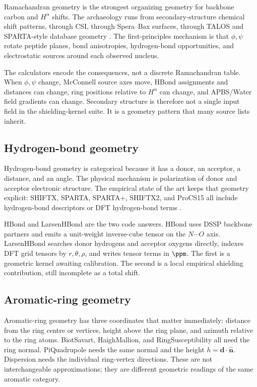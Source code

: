 \documentclass[11pt]{article}
\begin{document}
Ramachandran geometry is the strongest organizing geometry for backbone carbon
and \(H^\alpha\) shifts. The archaeology runs from secondary-structure chemical
shift patterns, through CSI, through Spera--Bax surfaces, through TALOS and
SPARTA-style database geometry \cite{williamson1990,wishart1992,spera1991,talos1999,shenbax2007}.
The first-principles mechanism is that \(\phi,\psi\) rotate peptide planes,
bond anisotropies, hydrogen-bond opportunities, and electrostatic sources
around each observed nucleus.

The calculators encode the consequences, not a discrete Ramachandran table.
When \(\phi,\psi\) change, McConnell source axes move, HBond assignments and
distances can change, ring positions relative to \(H^\alpha\) can change, and
APBS/Water field gradients can change. Secondary structure is therefore not a
single input field in the shielding-kernel suite. It is a geometry pattern that
many source lists inherit.

\subsection{Hydrogen-bond geometry}

Hydrogen-bond geometry is categorical because it has a donor, an acceptor, a
distance, and an angle. The physical mechanism is polarization of donor and
acceptor electronic structure. The empirical state of the art keeps that
geometry explicit: SHIFTX, SPARTA, SPARTA+, SHIFTX2, and ProCS15 all include
hydrogen-bond descriptors or DFT hydrogen-bond terms
\cite{neal2003,shenbax2007,shenbax2010,han2011,larsen2015}.

HBond and LarsenHBond are the two code answers. HBond uses DSSP backbone
partners and emits a unit-weight inverse-cube tensor on the \(N\cdots O\) axis.
LarsenHBond searches donor hydrogens and acceptor oxygens directly, indexes DFT
grid tensors by \(r,\theta,\rho\), and writes tensor terms in \(\si{\ppm}\).
The first is a geometric kernel awaiting calibration. The second is a local
empirical shielding contribution, still incomplete as a total shift.

\subsection{Aromatic-ring geometry}

Aromatic-ring geometry has three coordinates that matter immediately: distance
from the ring centre or vertices, height above the ring plane, and azimuth
relative to the ring atoms. BiotSavart, HaighMallion, and RingSusceptibility
all need the ring normal. PiQuadrupole needs the same normal and the height
\(h=\bm d\cdot\hat{\bm n}\). Dispersion needs the individual ring-vertex
directions. These are not interchangeable approximations; they are different
geometric readings of the same aromatic category.
\end{document}
